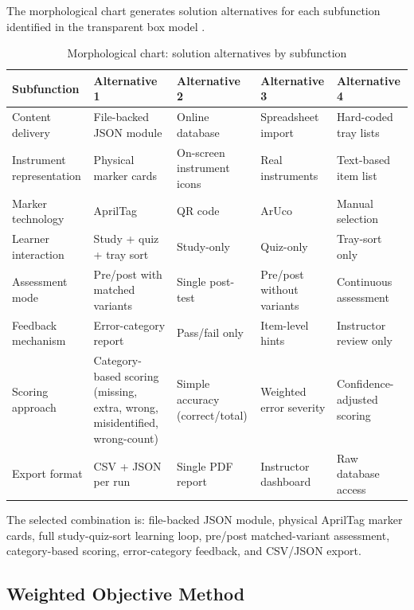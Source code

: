 \documentclass[10pt,a4paper]{article}
\begin{document}
The morphological chart generates solution alternatives for each subfunction
identified in the transparent box model \cite{ulrich-et-al-2020, pahl-beitz-2007}.

\begin{table}[H]
\centering
\caption{Morphological chart: solution alternatives by subfunction}
\label{tab:morphological-chart}
\small\renewcommand{\arraystretch}{1.2}\setlength{\tabcolsep}{4pt}
\begin{tabularx}{\textwidth}{|>{\raggedright\arraybackslash}X|>{\raggedright\arraybackslash}X|>{\raggedright\arraybackslash}X|>{\raggedright\arraybackslash}X|>{\raggedright\arraybackslash}X|}
\hline
Subfunction & Alternative 1 & Alternative 2 & Alternative 3 & Alternative 4 \\
\hline
Content delivery & File-backed JSON module & Online database & Spreadsheet import & Hard-coded tray lists \\
\hline
Instrument representation & Physical marker cards & On-screen instrument icons & Real instruments & Text-based item list \\
\hline
Marker technology & AprilTag & QR code & ArUco & Manual selection \\
\hline
Learner interaction & Study + quiz + tray sort & Study-only & Quiz-only & Tray-sort only \\
\hline
Assessment mode & Pre/post with matched variants & Single post-test & Pre/post without variants & Continuous assessment \\
\hline
Feedback mechanism & Error-category report & Pass/fail only & Item-level hints & Instructor review only \\
\hline
Scoring approach & Category-based scoring (missing, extra, wrong, misidentified, wrong-count) & Simple accuracy (correct/total) & Weighted error severity & Confidence-adjusted scoring \\
\hline
Export format & CSV + JSON per run & Single PDF report & Instructor dashboard & Raw database access \\
\hline
\end{tabularx}
\end{table}

The selected combination is: file-backed JSON module, physical AprilTag marker
cards, full study-quiz-sort learning loop, pre/post matched-variant assessment,
category-based scoring, error-category feedback, and CSV/JSON export.

\subsection{Weighted Objective Method}
\label{sec:weighted-objective-method}
\end{document}
